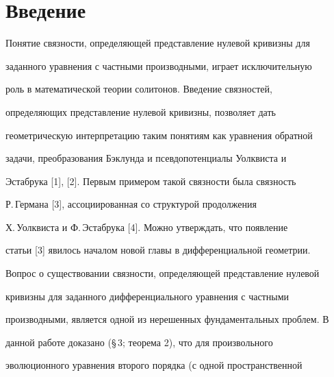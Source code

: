 \pagestyle{plain} %


 




\maketitle 


\label{begin} 


 


\section*{Введение} 


 


Понятие связности, определяющей представление нулевой кривизны для 


заданного уравнения с частными производными, играет исключительную 


роль в математической теории солитонов. Введение связностей, 


определяющих представление нулевой кривизны, позволяет дать 


геометрическую интерпретацию таким понятиям как уравнения обратной 


задачи, преобразования Бэклунда и псевдопотенциалы Уолквиста и 


Эстабрука [1], [2]. Первым примером такой связности была связность 


Р.\,Германа [3], ассоциированная со структурой продолжения 


Х.\,Уолквиста и Ф.\,Эстабрука [4]. Можно утверждать, что появление 


статьи [3] явилось началом новой главы в дифференциальной геометрии. 


 


Вопрос о существовании связности, определяющей представление нулевой 


кривизны для заданного дифференциального уравнения с частными 


производными, является одной из нерешенных фундаментальных проблем. В 


данной работе доказано (\S\,3; теорема 2), что для произвольного 


эволюционного уравнения второго порядка (с одной пространственной 


